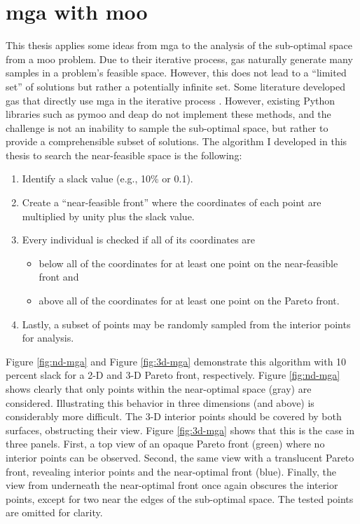 \section{\acs{mga} with \acl{moo}}
\label{section:mga-moo}

This thesis applies some ideas from \ac{mga} to the analysis of the sub-optimal
space from a \acl{moo} problem. Due to their iterative process, \acp{ga}
naturally generate many samples in a problem's feasible space. However, this
does not lead to a ``limited set'' of solutions but rather a potentially
infinite set. Some literature developed \acp{ga} that directly use \ac{mga} in
the iterative process
\cite{zechman_evolutionary_2004,zechman_evolutionary_2013}. However, existing
Python libraries such as \ac{pymoo} and \ac{deap} do not implement these
methods, and the challenge is not an inability to sample the sub-optimal space,
but rather to provide a comprehensible subset of solutions. The algorithm I
developed in this thesis to search the near-feasible space is the following:

\begin{enumerate}
    \item Identify a slack value (e.g., 10\% or 0.1). 
    \item Create a ``near-feasible front'' where the coordinates of each point
    are multiplied by unity plus the slack value.
    \item Every individual is checked if all of its coordinates are
    \begin{itemize}
        \item below all of the coordinates for at least one point on the
        near-feasible front and
        \item above all of the coordinates for at least one point on the Pareto
        front.
    \end{itemize}  
    \item Lastly, a subset of points may be randomly sampled from the interior
    points for analysis.
\end{enumerate}
\noindent
Figure \ref{fig:nd-mga} and Figure \ref{fig:3d-mga} demonstrate this algorithm
with 10 percent slack for a 2-D and 3-D Pareto front, respectively. Figure
\ref{fig:nd-mga} shows clearly that only points within the near-optimal space
(gray) are considered. Illustrating this behavior in three dimensions (and
above) is considerably more difficult. The 3-D interior points should be covered
by both surfaces, obstructing their view. Figure \ref{fig:3d-mga} shows that
this is the case in three panels. First, a top view of an opaque Pareto front
(green) where no interior points can be observed. Second, the same view with a
translucent Pareto front, revealing interior points and the near-optimal front
(blue). Finally, the view from underneath the near-optimal front once again
obscures the interior points, except for two near the edges of the sub-optimal
space. The tested points are omitted for clarity.
 


